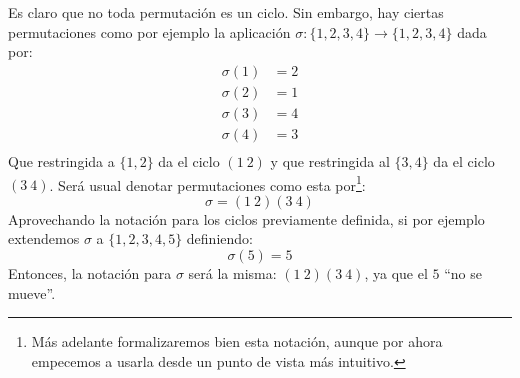 \begin{notacion}
    Es claro que no toda permutación es un ciclo. Sin embargo, hay ciertas permutaciones como por ejemplo la aplicación $\sigma:\{1,2,3,4\}\rightarrow \{1,2,3,4\}$ dada por:
    \begin{align*}
        \sigma(1) &= 2 \\
        \sigma(2) &= 1 \\
        \sigma(3) &= 4 \\
        \sigma(4) &= 3 \\
    \end{align*}
    Que restringida a $\{1,2\}$ da el ciclo $(1\ 2)$ y que restringida al $\{3, 4\}$ da el ciclo $(3\ 4)$. Será usual denotar permutaciones como esta por\footnote{Más adelante formalizaremos bien esta notación, aunque por ahora empecemos a usarla desde un punto de vista más intuitivo.}:
    \begin{equation*}
        \sigma = (1\ 2)(3\ 4)
    \end{equation*}
    Aprovechando la notación para los ciclos previamente definida, si por ejemplo extendemos $\sigma$ a $\{1,2,3,4,5\}$ definiendo:
    \begin{equation*}
        \sigma(5) = 5
    \end{equation*}
    Entonces, la notación para $\sigma$ será la misma: $(1\ 2)(3\ 4)$, ya que el $5$ ``no se mueve''.
\end{notacion}

